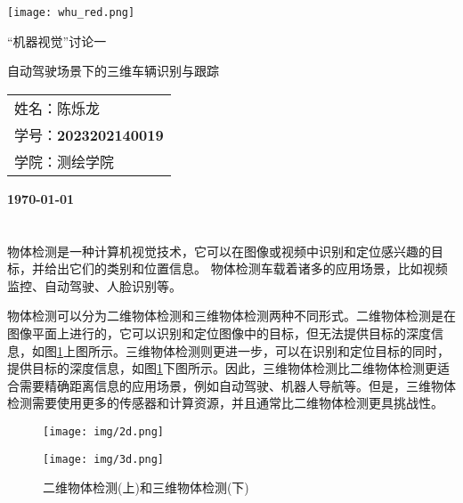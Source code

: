 \documentclass[12pt, twocolumn]{article}
\title{\normf{编程：观测值逐次更新的扩展卡尔曼滤波器}}
\author{\normf 姓名：陈烁龙\;\;\;学号：2023202140019\;\;\;学院：测绘学院}
\date{\normf{\today}}
\newcommand\normf{\fangsong}
\begin{document}
	\begin{titlepage}
	    \centering
	    \texttt{[image: whu\_red.png]}\par\vspace{1cm}
	    \vspace{4cm}
	    {\huge\kaishu “机器视觉”讨论一\par 自动驾驶场景下的三维车辆识别与跟踪 \par}
	    \vspace{3cm}
	    {\Large\kaishu 
	    \begin{center}\begin{tabular}{l}
	    姓名：陈烁龙\\
	    学号：\bfseries 2023202140019\\
	    学院：测绘学院
	    \end{tabular}\end{center}
	     \par}
	    
	
	    \vfill
	
	    {\large\kaishu\bfseries \today\par}
	\end{titlepage}
 		\thispagestyle{empty}
		\clearpage
		
		\tableofcontents
		\newpage
		\listoffigures
		
		\clearpage
		\setcounter{page}{1}
	
	\section{\normf{研究背景与现状}}
	\normf
	物体检测是一种计算机视觉技术，它可以在图像或视频中识别和定位感兴趣的目标，并给出它们的类别和位置信息。
	物体检测车载着诸多的应用场景，比如视频监控、自动驾驶、人脸识别等。
	
	物体检测可以分为二维物体检测和三维物体检测两种不同形式。二维物体检测是在图像平面上进行的，它可以识别和定位图像中的目标，但无法提供目标的深度信息，如图\ref{fig:物体检测}上图所示。三维物体检测则更进一步，可以在识别和定位目标的同时，提供目标的深度信息，如图\ref{fig:物体检测}下图所示。因此，三维物体检测比二维物体检测更适合需要精确距离信息的应用场景，例如自动驾驶、机器人导航等。但是，三维物体检测需要使用更多的传感器和计算资源，并且通常比二维物体检测更具挑战性。
	\begin{figure}[h]
		\centering
		\texttt{[image: img/2d.png]}
		
		\vspace{2 mm}
		
		\texttt{[image: img/3d.png]}
		\caption{\normf 二维物体检测(上)和三维物体检测(下)}
		\label{fig:物体检测}
	\end{figure}
	
\end{document}
